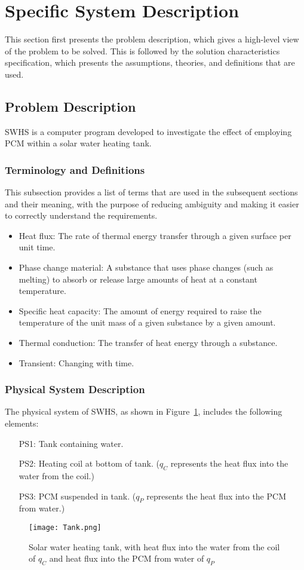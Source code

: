 \documentclass[12pt]{article}
\begin{document}
\section{Specific System Description}
\label{Sec:SpecSystDesc}
This section first presents the problem description, which gives a high-level view of the problem to be solved. This is followed by the solution characteristics specification, which presents the assumptions, theories, and definitions that are used.
\subsection{Problem Description}
\label{Sec:ProbDesc}
SWHS is a computer program developed to investigate the effect of employing PCM within a solar water heating tank.
\subsubsection{Terminology and Definitions}
\label{Sec:TermDefs}
This subsection provides a list of terms that are used in the subsequent sections and their meaning, with the purpose of reducing ambiguity and making it easier to correctly understand the requirements.
\begin{itemize}
\item{Heat flux: The rate of thermal energy transfer through a given surface per unit time.}
\item{Phase change material: A substance that uses phase changes (such as melting) to absorb or release large amounts of heat at a constant temperature.}
\item{Specific heat capacity: The amount of energy required to raise the temperature of the unit mass of a given substance by a given amount.}
\item{Thermal conduction: The transfer of heat energy through a substance.}
\item{Transient: Changing with time.}
\end{itemize}
\subsubsection{Physical System Description}
\label{Sec:PhysSyst}
The physical system of SWHS, as shown in Figure~\ref{Figure:Tank}, includes the following elements:
\begin{itemize}
\item[PS1:]Tank containing water.
\item[PS2:]Heating coil at bottom of tank. (${q_{C}}$ represents the heat flux into the water from the coil.)
\item[PS3:]PCM suspended in tank. (${q_{P}}$ represents the heat flux into the PCM from water.)
\end{itemize}
\begin{figure}
\begin{center}
\texttt{[image: Tank.png]}
\caption{Solar water heating tank, with heat flux into the water from the coil of ${q_{C}}$ and heat flux into the PCM from water of ${q_{P}}$}
\label{Figure:Tank}
\end{center}
\end{figure}
\end{document}
